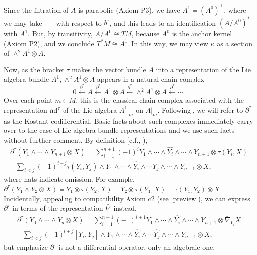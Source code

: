 \documentclass[leqno,12pt]{amsart} %
\newcommand{\leftpartial}[1]{\xleftarrow{\partial^{#1}}}
\begin{document}
Since the filtration of $A$ is parabolic (Axiom P3), we have $A^1 = (A^0)^\perp$, where we
may take $\perp$ with respect to $b^\tau$, and this leads to an identification $(A/A^0)^*$
with $A^1$. But, by transitivity, $A/A^0\cong TM $, because $A^0$ is the anchor kernel
(Axiom P2), and we conclude $T^*\!M \cong A^1$. In this way, we may view $\kappa$ as a
section of $\wedge^2 A^1 \otimes A$.

Now, as the bracket $\tau $ makes the vector bundle $A$ into a representation of the Lie
algebra bundle $A^1$, $\wedge^2 A^1 \otimes A $ appears in a natural chain complex
\begin{equation}
  \label{chain1_} 0 \leftpartial{\tau} A \leftpartial{\tau} A^1 \otimes A
\leftpartial{\tau} \wedge^2 A^1 \otimes A \leftpartial{\tau} \cdots.
\end{equation} Over each point $m \in M$, this is the classical chain complex associated
with the representation $\operatorname{ad}^\tau$ of the Lie algebra $A^1|_m$ on $A|_m$.
Following \cite{Cap_Slovak_09},
we will refer to $\partial^\tau $ as the {\df Kostant codifferential}.
Basic facts about such complexes immediately carry
over to the case of Lie algebra bundle representations and we use such facts without
further comment. By definition (c.f.,
\cite[p.~262]{Cap_Slovak_09}),
%
\begin{multline}
  \label{form1}
  \partial^\tau(Y_1 \wedge \cdots \wedge Y_{n+1} \otimes X) =
  \sum_{i=1}^{n+1}(-1)^i Y_1 \wedge \cdots \wedge \widehat{Y_i} \wedge \cdots \wedge Y_{n+1}
  \otimes \tau(Y_i,X)\\ +\sum_{i<j}(-1)^{i+j}\tau(Y_i,Y_j) \wedge Y_1 \wedge \cdots \wedge
  \widehat{Y_i} \wedge \cdots \widehat{Y_j} \wedge \cdots \wedge Y_{n+1} \otimes X,
\end{multline}
%
where hats indicate omission. For example,
$\partial^\tau(Y_1\wedge Y_2 \otimes X) = Y_1 \otimes \tau(Y_2, X) - Y_2 \otimes \tau(Y_1,
X) -\tau(Y_1, Y_2)\otimes X$. Incidentally, appealing to compatibility Axiom c2 (see
\ref{preview}), we can express $\partial^\tau $ in terms of the representation
$\bar\nabla$ instead,
\begin{multline*} \partial^\tau(Y_0 \wedge \cdots \wedge Y_n \otimes X) =
  \sum_{i=1}^{n+1}(-1)^{i+1} Y_1 \wedge \cdots \wedge \widehat{Y_i} \wedge \cdots \wedge
  Y_{n+1} \otimes \bar\nabla_{Y_i}X\\ +\sum_{i<j}(-1)^{i+j}[Y_i,Y_j] \wedge Y_1 \wedge
  \cdots \wedge \widehat{Y_i} \wedge \cdots \widehat{Y_j} \wedge \cdots \wedge Y_{n+1}
  \otimes X,\label{form1}
\end{multline*}
but emphasize $\partial^\tau $ is not a differential operator, only an algebraic one.
\end{document}
